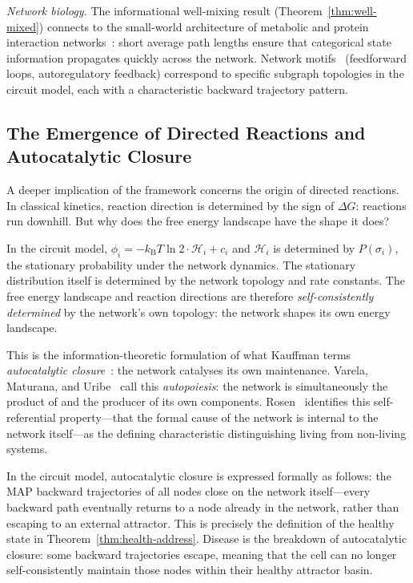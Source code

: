 \documentclass[twocolumn,10pt,a4paper]{article}
\newcommand{\kB}{k_{\mathrm{B}}}
\newcommand{\Hcat}{\mathcal{H}}
\begin{document}
\emph{Network biology.}
The informational well-mixing result (Theorem~\ref{thm:well-mixed}) connects to
the small-world architecture of metabolic and protein interaction
networks~\cite{BarabasiOltvai2004,Wagner2001}: short average path lengths
ensure that categorical state information propagates quickly across the network.
Network motifs~\cite{Alon2007,Alon2007book} (feedforward loops, autoregulatory
feedback) correspond to specific subgraph topologies in the circuit model, each
with a characteristic backward trajectory pattern.

\subsection{The Emergence of Directed Reactions and Autocatalytic Closure}
\label{sec:disc-autopoiesis}

A deeper implication of the framework concerns the origin of directed reactions.
In classical kinetics, reaction direction is determined by the sign of $\Delta G$:
reactions run downhill.  But why does the free energy landscape have the shape
it does?

In the circuit model, $\phi_i=-\kB T\ln 2\cdot\Hcat_i+c_i$ and $\Hcat_i$ is
determined by $P(\sigma_i)$, the stationary probability under the network
dynamics.  The stationary distribution itself is determined by the network
topology and rate constants.  The free energy landscape and reaction directions
are therefore \emph{self-consistently determined} by the network's own topology:
the network shapes its own energy landscape.

This is the information-theoretic formulation of what Kauffman terms
\emph{autocatalytic closure}~\cite{Kauffman1993}: the network catalyses its
own maintenance.  Varela, Maturana, and Uribe~\cite{VarelaMaturanaUribe1974}
call this \emph{autopoiesis}: the network is simultaneously the product of and
the producer of its own components.  Rosen~\cite{Rosen1991} identifies this
self-referential property---that the formal cause of the network is internal to
the network itself---as the defining characteristic distinguishing living from
non-living systems.

In the circuit model, autocatalytic closure is expressed formally as follows:
the MAP backward trajectories of all nodes close on the network itself---every
backward path eventually returns to a node already in the network, rather than
escaping to an external attractor.  This is precisely the definition of the
healthy state in Theorem~\ref{thm:health-address}.  Disease is the breakdown
of autocatalytic closure: some backward trajectories escape, meaning that the
cell can no longer self-consistently maintain those nodes within their healthy
attractor basin.
\end{document}

